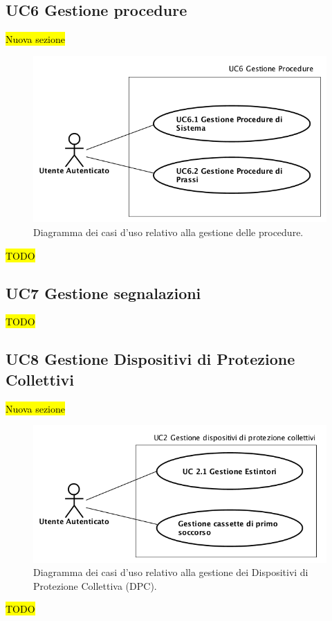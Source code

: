 	\subsection{UC6 Gestione procedure}
		\label{section:UC6}
		\hl{Nuova sezione}
		\begin{figure}[H]
			\begin{center}
				\includegraphics[width=12cm]{Pics/UC6GestioneProcedure.png}
				\caption{Diagramma dei casi d'uso relativo alla gestione delle procedure.}
				\label{fig:UC6_Procedure}
			\end{center}
		\end{figure}
		\hl{TODO}
	\subsection{UC7 Gestione segnalazioni}
		\label{section:UC7}	
		\hl{TODO}
	\subsection{UC8 Gestione Dispositivi di Protezione Collettivi}
		\label{section:UC8}
		\hl{Nuova sezione}
		\begin{figure}[H]
			\begin{center}
				\includegraphics[width=12cm]{Pics/UC8GestioneDispositiviProtezioneCollettivi.png}
				\caption{Diagramma dei casi d'uso relativo alla gestione dei Dispositivi di Protezione Collettiva (DPC).}
				\label{fig:UC2_DPC}
			\end{center}
		\end{figure}
		\hl{TODO}


